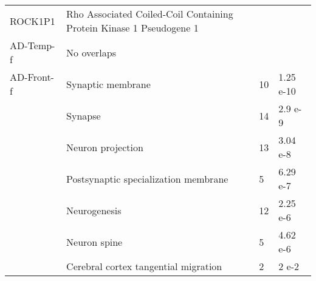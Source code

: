 \begin{table}[!ht]
\begin{tabularx}{1.0\textwidth}{L{2cm}L{2.5cm}L{8cm}C{1.5cm}}
  ROCK1P1 &
  Rho Associated Coiled-Coil Containing Protein Kinase 1 Pseudogene 1 &
   \\
AD-Temp-f &
  No overlaps &
   &
   \\
AD-Front-f &
  Synaptic membrane &
  10 &
  1.25 e-10 \\
 &
  Synapse &
  14 &
  2.9 e-9 \\
 &
  Neuron projection &
  13 &
  3.04 e-8 \\
 &
  Postsynaptic specialization membrane &
  5 &
  6.29 e-7 \\
 &
  Neurogenesis &
  12 &
  2.25 e-6 \\
 &
  Neuron spine &
  5 &
  4.62 e-6 \\
 &
  Cerebral cortex tangential migration &
  2 &
  2 e-2 \\
  \bottomrule
  
\end{tabularx}
\end{table}


